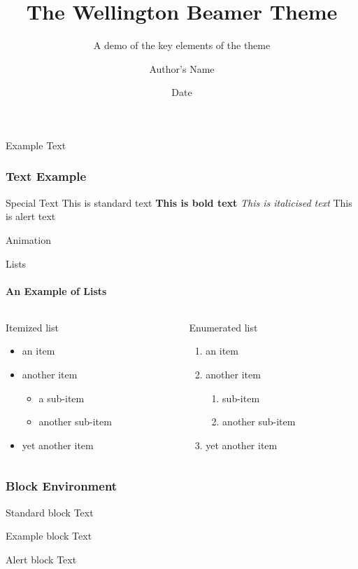 \documentclass[12pt,aspectratio=169]{beamer}
\title{The Wellington Beamer Theme}
\subtitle{A demo of the key elements of the theme}
\date{Date}
\author{Author's Name}
\institute{Institution}
\begin{document}
\begin{frame}
		\titlepage
\end{frame}


\begin{frame}{Example Text}
	    \frametitle{Text Example}
	     \lipsum[1]
\end{frame}


\begin{frame}{Special Text}
This is standard text
\textbf{This is bold text}
\textit{This is italicised text}
\alert{This is alert text}
\end{frame}


\begin{frame}{Animation}

\end{frame}

\begin{frame}{Lists}
\framesubtitle{An Example of Lists}
\begin{columns}
\begin{column}{0.5\textwidth}
   Itemized list
		\begin{itemize}
			\item an item
			\item another item
                \begin{itemize}
                  \item a sub-item
                  \item another sub-item
                \end{itemize}
			\item yet another item
		\end{itemize}
\end{column}
\begin{column}{0.5\textwidth}
    Enumerated list
		\begin{enumerate}
			\item an item
			\item another item
                \begin{enumerate}
                  \item sub-item
                  \item another sub-item
                \end{enumerate}
			\item yet another item
		\end{enumerate}
\end{column}
\end{columns}
\end{frame}


\begin{frame}
\frametitle{Block Environment}
    \begin{block}{Standard block}
    Text
    \end{block}
    \begin{exampleblock}{Example block}
    Text
    \end{exampleblock}
    \begin{alertblock}{Alert block}
    Text
    \end{alertblock}
\end{frame}
\end{document}
